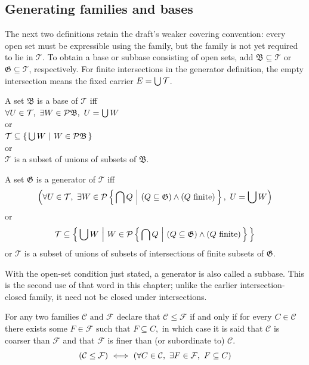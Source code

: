 \subsection{Generating families and bases}
The next two definitions retain the draft's weaker covering convention:
every open set must be expressible using the family, but the family is
not yet required to lie in $\mathcal{T}$. To obtain a base or subbase
consisting of open sets, add $\mathfrak{B}\subseteq\mathcal{T}$ or
$\mathfrak{G}\subseteq\mathcal{T}$, respectively. For finite
intersections in the generator definition, the empty intersection means
the fixed carrier $E=\bigcup\mathcal{T}$.
\begin{definition}[base]
A set $\mathfrak{B}$ is a base of $\mathcal{T}$ iff\\
$\forall U\in\mathcal{T},\ \exists W\in\mathcal{P}\mathfrak{B},\ U=\bigcup W$\\
or\\
$\mathcal{T}\subseteq \left\{\,\bigcup W \ \middle|\   W\in\mathcal{P}\mathfrak{B}\,\right\}$\\
or\\
$\mathcal{T}$ is a subset of unions of subsets of $\mathfrak{B}$.
\end{definition}

\begin{definition}[generator]
A set $\mathfrak{G}$ is a generator of $\mathcal{T}$ iff
\[
\left(\forall U\in\mathcal{T},\ \exists W\in\mathcal{P}\left\{\,\bigcap Q \ \middle|\  (Q\subseteq \mathfrak{G}) \land (Q \mathrm{\ finite}) \,\right\},\ U=\bigcup W
\right)
\]
or
\[
\mathcal{T}
\subseteq
\left\{\,\bigcup W \ \middle|\   W\in\mathcal{P}\left\{\,\bigcap Q \ \middle|\  (Q\subseteq \mathfrak{G}) \land (Q \mathrm{\ finite}) \,\right\}\,\right\}
\]
or $\mathcal{T}$ is a subset of unions of subsets of intersections of finite subsets of $\mathfrak{G}$.
\end{definition}
With the open-set condition just stated, a generator is also called a
subbase. This is the second use of that word in this chapter; unlike the
earlier intersection-closed family, it need not be closed under intersections.

\begin{definition}
For any two families $\mathcal{C} \text{ and } \mathcal{F}$ declare that $\mathcal{C} \leq \mathcal{F}$ if and only if for every $C \in \mathcal{C}$ there exists some $F \in \mathcal{F} \text{ such that } F \subseteq C,$ in which case it is said that $\mathcal{C}$ is coarser than $\mathcal{F}$ and that $\mathcal{F}$ is finer than (or subordinate to) $\mathcal{C}$.
\[
(\mathcal{C} \leq \mathcal{F})
\ \Longleftrightarrow\ 
(\forall C \in \mathcal{C},\ \exists F \in \mathcal{F},\  F \subseteq C)
\]
\end{definition}

